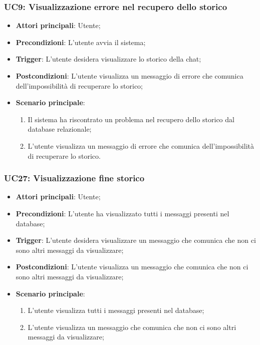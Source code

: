 \hypertarget{UC9}{}
\subsubsection{UC9: Visualizzazione errore nel recupero dello storico}
\begin{itemize}
    \item \textbf{Attori principali}: Utente;
    \item \textbf{Precondizioni}: L'utente avvia il sistema;
    \item \textbf{Trigger}: L'utente desidera visualizzare lo storico della chat;
    \item \textbf{Postcondizioni}: L'utente visualizza un messaggio di errore che comunica dell'impossibilità di recuperare lo storico;
    \item \textbf{Scenario principale}: 
    \begin{enumerate}
        \item Il sistema ha riscontrato un problema nel recupero dello storico dal database relazionale;
        \item L'utente visualizza un messaggio di errore che comunica dell'impossibilità di recuperare lo storico.
    \end{enumerate}
\end{itemize}

\hypertarget{UC27}{}
\subsubsection{UC27: Visualizzazione fine storico}
\begin{itemize}
    \item \textbf{Attori principali}: Utente;
    \item \textbf{Precondizioni}: L'utente ha visualizzato tutti i messaggi presenti nel database;
    \item \textbf{Trigger}: L'utente desidera visualizzare un messaggio che comunica che non ci sono altri messaggi da visualizzare;
    \item \textbf{Postcondizioni}: L'utente visualizza un messaggio che comunica che non ci sono altri messaggi da visualizzare;
    \item \textbf{Scenario principale}:
    \begin{enumerate}
        \item L'utente visualizza tutti i messaggi presenti nel database;
        \item L'utente visualizza un messaggio che comunica che non ci sono altri messaggi da visualizzare;
    \end{enumerate}
\end{itemize}

